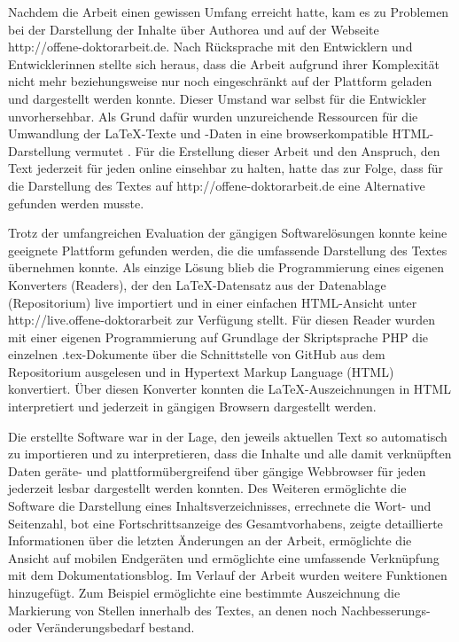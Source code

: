 Nachdem die Arbeit einen gewissen Umfang erreicht hatte, kam es zu Problemen bei der Darstellung der Inhalte über Authorea und auf der Webseite http://offene-doktorarbeit.de. Nach Rücksprache mit den Entwicklern und Entwicklerinnen stellte sich heraus, dass die Arbeit aufgrund ihrer Komplexität nicht mehr beziehungsweise nur noch eingeschränkt auf der Plattform geladen und dargestellt werden konnte. Dieser Umstand war selbst für die Entwickler unvorhersehbar. Als Grund dafür wurden unzureichende Ressourcen für die Umwandlung der LaTeX-Texte und -Daten in eine browserkompatible HTML-Darstellung vermutet \cite{Authorea_2014}. Für die Erstellung dieser Arbeit und den Anspruch, den Text jederzeit für jeden online einsehbar zu halten, hatte das zur Folge, dass für die Darstellung des Textes auf http://offene-doktorarbeit.de eine Alternative gefunden werden musste.

Trotz der umfangreichen Evaluation der gängigen Softwarelösungen konnte keine geeignete Plattform gefunden werden, die die umfassende Darstellung des Textes übernehmen konnte. Als einzige Lösung blieb die Programmierung eines eigenen Konverters (Readers), der den LaTeX-Datensatz aus der Datenablage (Repositorium) live importiert und in einer einfachen HTML-Ansicht unter http://live.offene-doktorarbeit zur Verfügung stellt. Für diesen Reader wurden mit einer eigenen Programmierung auf Grundlage der Skriptsprache PHP die einzelnen .tex-Dokumente über die Schnittstelle von GitHub aus dem Repositorium ausgelesen und in Hypertext Markup Language (HTML) konvertiert. Über diesen Konverter konnten die LaTeX-Auszeichnungen in HTML interpretiert und jederzeit in gängigen Browsern dargestellt werden.

Die erstellte Software war in der Lage, den jeweils aktuellen Text so automatisch zu importieren und zu interpretieren, dass die Inhalte und alle damit verknüpften Daten geräte- und plattformübergreifend über gängige Webbrowser für jeden jederzeit lesbar dargestellt werden konnten. Des Weiteren ermöglichte die Software die Darstellung eines Inhaltsverzeichnisses, errechnete die Wort- und Seitenzahl, bot eine Fortschrittsanzeige des Gesamtvorhabens, zeigte detaillierte Informationen über die letzten Änderungen an der Arbeit, ermöglichte die Ansicht auf mobilen Endgeräten und ermöglichte eine umfassende Verknüpfung mit dem Dokumentationsblog. Im Verlauf der Arbeit wurden weitere Funktionen hinzugefügt. Zum Beispiel ermöglichte eine bestimmte Auszeichnung die Markierung von Stellen innerhalb des Textes, an denen noch Nachbesserungs- oder Veränderungsbedarf bestand.

